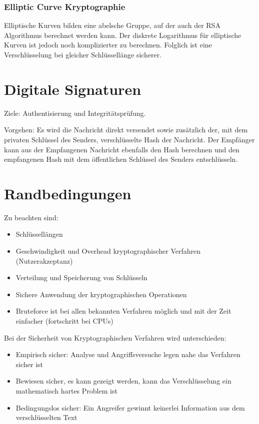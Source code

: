 \subsubsection{Elliptic Curve Kryptographie}
Elliptische Kurven bilden eine abelsche Gruppe, auf der auch der RSA Algorithmus berechnet werden kann. Der diskrete Logarithmus für elliptische Kurven ist jedoch noch komplizierter zu berechnen. Folglich ist eine Verschlüsselung bei gleicher Schlüssellänge sicherer.

\section{Digitale Signaturen}
Ziele: Authentisierung und Integritätsprüfung.

Vorgehen:
Es wird die Nachricht direkt versendet sowie zusätzlich der, mit dem privaten Schlüssel des Senders, verschlüsselte Hash der Nachricht. Der Empfänger kann aus der Empfangenen Nachricht ebenfalls den Hash berechnen und den empfangenen Hash mit dem öffentlichen Schlüssel des Senders entschlüsseln.

\section{Randbedingungen}
Zu beachten sind:
\begin{itemize}
    \item Schlüssellängen
    \item Geschwindigkeit und Overhead kryptographischer Verfahren (Nutzerakzeptanz)
    \item Verteilung und Speicherung von Schlüsseln
    \item Sichere Anwendung der kryptographischen Operationen
    \item Bruteforce ist bei allen bekannten Verfahren möglich und mit der Zeit einfacher (fortschritt bei CPUs)
\end{itemize}

Bei der Sicherheit von Kryptographischen Verfahren wird unterschieden:
\begin{itemize}
    \item Empirisch sicher: Analyse und Angriffsversuche legen nahe das Verfahren sicher ist
    \item Bewiesen sicher, es kann gezeigt werden, kann das Verschlüsselung ein mathematisch hartes Problem ist
    \item Bedingungslos sicher: Ein Angreifer gewinnt keinerlei Information aus dem verschlüsselten Text
\end{itemize}

